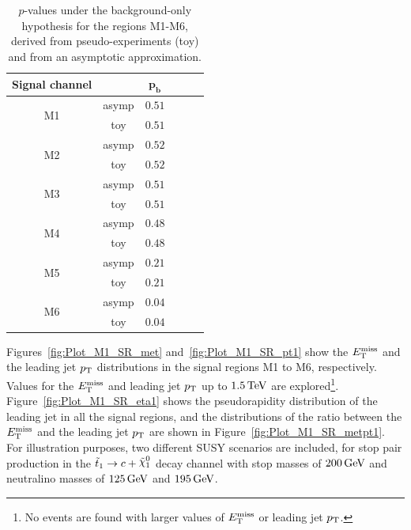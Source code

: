 
\begin{table}[tb]
\begin{center}
\begin{tabular}{cccccc}
\hline\hline
{\bf Signal channel} & & $\mathbf{p_b}$ \\
\hline
\multirow{2}{*}{M1} & asymp & $0.51$ \\
                    & toy   & $0.51$ \\
\multirow{2}{*}{M2} & asymp & $0.52$ \\
                    & toy   & $0.52$ \\
\multirow{2}{*}{M3} & asymp & $0.51$ \\
                    & toy   & $0.51$ \\
\multirow{2}{*}{M4} & asymp & $0.48$ \\
                    & toy   & $0.48$ \\
\multirow{2}{*}{M5} & asymp & $0.21$ \\
                    & toy   & $0.21$ \\
\multirow{2}{*}{M6} & asymp & $0.04$ \\
                    & toy   & $0.04$ \\
\hline\hline
\end{tabular}
\end{center}
\caption{$p$-values under the background-only hypothesis for the regions M1-M6, derived from pseudo-experiments (toy) and from an asymptotic approximation.}
\label{tab:pValuesBackgroundOnly}
\end{table}

\clearpage

Figures~\ref{fig:Plot_M1_SR_met} and~\ref{fig:Plot_M1_SR_pt1} show the $E_{\mathrm{T}}^{\mathrm{miss}}$ and the leading jet $p_{\mathrm{T}}$ distributions in the signal regions M1 to M6, respectively.
Values for the $E_{\mathrm{T}}^{\mathrm{miss}}$ and leading jet $p_{\mathrm{T}}$ up to $\unit[1.5]{TeV}$ are explored\footnote{No events are found with larger values of $E_{\mathrm{T}}^{\mathrm{miss}}$ or leading jet $p_{\mathrm{T}}$.}.
Figure~\ref{fig:Plot_M1_SR_eta1} shows the pseudorapidity distribution of the leading jet in all the signal regions, and the distributions of the ratio between the $E_{\mathrm{T}}^{\mathrm{miss}}$ and the leading jet $p_{\mathrm{T}}$ are shown in Figure~\ref{fig:Plot_M1_SR_metpt1}.
For illustration purposes, two different SUSY scenarios are included, for stop pair production in the $\stoptocharm$ decay channel with stop masses of $\unit[200]{GeV}$ and neutralino masses of $\unit[125]{GeV}$ and $\unit[195]{GeV}$.


